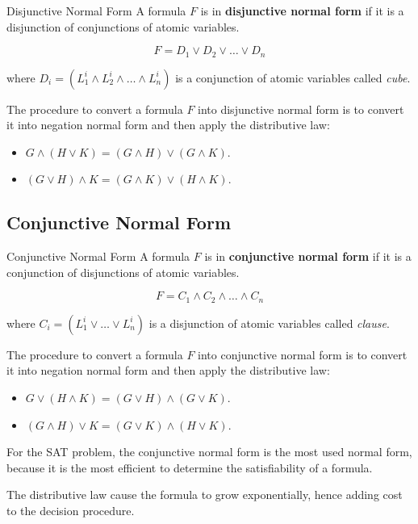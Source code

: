 \begin{definition}{Disjunctive Normal Form}
    A formula $F$ is in \textbf{disjunctive normal form} if
    it is a disjunction of conjunctions of atomic variables.

    \begin{equation}
        F = D_{1} \lor D_{2} \lor \dots \lor D_{n}
    \end{equation}

    where $D_{i} = (L_{1}^i \land L_{2}^i \land \dots \land L_{n}^i)$ is a 
    conjunction of atomic variables called \textit{cube}.
\end{definition}

The procedure to convert a formula $F$ into disjunctive normal form is
to convert it into negation normal form and then apply the distributive law:
\begin{itemize}
    \item $G \land (H \lor K) = (G \land H) \lor (G \land K)$.
    \item $(G \lor H) \land K = (G \land K) \lor (H \land K)$.
\end{itemize}

\subsection{Conjunctive Normal Form}
\label{subsec:Conjunctive Normal Form}

\begin{definition}{Conjunctive Normal Form}
    A formula $F$ is in \textbf{conjunctive normal form} if
    it is a conjunction of disjunctions of atomic variables.

    \begin{equation}
        F = C_{1} \land C_{2} \land \dots \land C_{n}
    \end{equation}

    where $C_{i} = (L_1^i \lor \dots \lor L_n^i)$ is a disjunction of atomic variables
    called \textit{clause}.
\end{definition}

The procedure to convert a formula $F$ into conjunctive normal form is 
to convert it into negation normal form and then apply the distributive law:
\begin{itemize}
    \item $G \lor (H \land K) = (G \lor H) \land (G \lor K)$.
    \item $(G \land H) \lor K = (G \lor K) \land (H \lor K)$.
\end{itemize}

For the SAT problem, the conjunctive normal form is the most used normal form,
because it is the most efficient to determine the satisfiability of a formula.

The distributive law cause the formula to grow exponentially,
hence adding cost to the decision procedure.